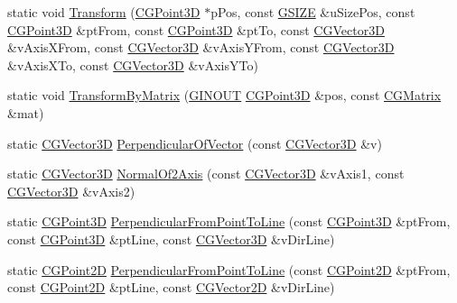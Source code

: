 \begin{DoxyCompactItemize}
\item 
static void \hyperlink{class_c_g_math_ab32ff36b7697357cca847463783c35be}{Transform} (\hyperlink{class_c_g_point3_d}{C\+G\+Point3\+D} $\ast$p\+Pos, const \hyperlink{_g_types_8h_ac7dd75e8df268a0368c6cb433764fdcb}{G\+S\+I\+Z\+E} \&u\+Size\+Pos, const \hyperlink{class_c_g_point3_d}{C\+G\+Point3\+D} \&pt\+From, const \hyperlink{class_c_g_point3_d}{C\+G\+Point3\+D} \&pt\+To, const \hyperlink{_g_point3_d_8h_aa7e73d39f4c991acb5a13c84b498366d}{C\+G\+Vector3\+D} \&v\+Axis\+X\+From, const \hyperlink{_g_point3_d_8h_aa7e73d39f4c991acb5a13c84b498366d}{C\+G\+Vector3\+D} \&v\+Axis\+Y\+From, const \hyperlink{_g_point3_d_8h_aa7e73d39f4c991acb5a13c84b498366d}{C\+G\+Vector3\+D} \&v\+Axis\+X\+To, const \hyperlink{_g_point3_d_8h_aa7e73d39f4c991acb5a13c84b498366d}{C\+G\+Vector3\+D} \&v\+Axis\+Y\+To)
\item 
static void \hyperlink{class_c_g_math_a54bdbccecf50771330c2e696d46dc78a}{Transform\+By\+Matrix} (\hyperlink{_g_types_8h_a3fc97b512f82d8e1a710da1235f9142a}{G\+I\+N\+O\+U\+T} \hyperlink{class_c_g_point3_d}{C\+G\+Point3\+D} \&pos, const \hyperlink{class_c_g_matrix}{C\+G\+Matrix} \&mat)
\item 
static \hyperlink{_g_point3_d_8h_aa7e73d39f4c991acb5a13c84b498366d}{C\+G\+Vector3\+D} \hyperlink{class_c_g_math_a50c391ac6b473457b2c0613656af3a41}{Perpendicular\+Of\+Vector} (const \hyperlink{_g_point3_d_8h_aa7e73d39f4c991acb5a13c84b498366d}{C\+G\+Vector3\+D} \&v)
\item 
static \hyperlink{_g_point3_d_8h_aa7e73d39f4c991acb5a13c84b498366d}{C\+G\+Vector3\+D} \hyperlink{class_c_g_math_a2403987ed4bcce1f7292ab35708de9bf}{Normal\+Of2\+Axis} (const \hyperlink{_g_point3_d_8h_aa7e73d39f4c991acb5a13c84b498366d}{C\+G\+Vector3\+D} \&v\+Axis1, const \hyperlink{_g_point3_d_8h_aa7e73d39f4c991acb5a13c84b498366d}{C\+G\+Vector3\+D} \&v\+Axis2)
\item 
static \hyperlink{class_c_g_point3_d}{C\+G\+Point3\+D} \hyperlink{class_c_g_math_af46db59addb0c8aaa9a718ccc41294a0}{Perpendicular\+From\+Point\+To\+Line} (const \hyperlink{class_c_g_point3_d}{C\+G\+Point3\+D} \&pt\+From, const \hyperlink{class_c_g_point3_d}{C\+G\+Point3\+D} \&pt\+Line, const \hyperlink{_g_point3_d_8h_aa7e73d39f4c991acb5a13c84b498366d}{C\+G\+Vector3\+D} \&v\+Dir\+Line)
\item 
static \hyperlink{class_c_g_point2_d}{C\+G\+Point2\+D} \hyperlink{class_c_g_math_af42338cab327e3c554362d596779e515}{Perpendicular\+From\+Point\+To\+Line} (const \hyperlink{class_c_g_point2_d}{C\+G\+Point2\+D} \&pt\+From, const \hyperlink{class_c_g_point2_d}{C\+G\+Point2\+D} \&pt\+Line, const \hyperlink{_g_point2_d_8h_aff6ea6caec53d1335aa72b3dc75ef8ec}{C\+G\+Vector2\+D} \&v\+Dir\+Line)

\end{DoxyCompactItemize}
